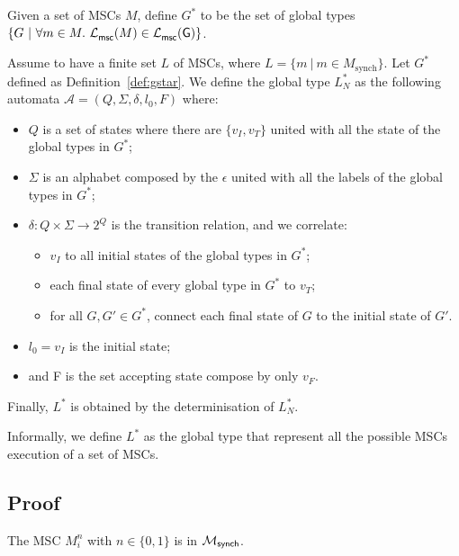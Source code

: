 \begin{definition}[$G^*$]\label{def:gstar}
Given a set of MSCs $M$, define $G^*$ to be the set of global types
$\{G\ |\ \forall m \in M.\ \mathcal{L}_{\mathsf{msc}}^{}(M)\in\mathcal{L}_{\mathsf{msc}}^{}(\mathsf{G})\}$.
\end{definition}

\begin{definition}\label{def:lstar}
Assume to have a finite set $L$ of MSCs, where  
$L = \{m\ |\ m \in M_{\text{synch}}\}$. Let $G^*$ defined as
Definition~\ref{def:gstar}.
We define the global type $L^*_{N}$ as the following automata
$\mathcal A = (Q,\Sigma, \delta, l_0, F)$ where:
\begin{itemize}
  \item $Q$ is a set of states where there are $\{v_I,v_T\}$ united with
  all the state of the global types in $G^*$;
  \item $\Sigma$ is an alphabet composed by the $\epsilon$ united with
  all the labels of the global types in $G^*$;
  \item $\delta:Q\times\Sigma\to 2^Q$ is the transition relation, and
  we correlate: 
  \begin{itemize}
    \item $v_I$ to all initial states of the global types in $G^*$;
    \item each final state of every global type in $G^*$ to $v_T$;
    \item for all $G, G' \in G^*$, connect each final state of $G$
    to the initial state of $G'$.
  \end{itemize}
  \item $l_0 = v_I$ is the initial state;
  \item and F is the set accepting state compose by only $v_F$.
\end{itemize}
Finally, $L^*$ is obtained by the determinisation of $L^*_{N}$.
\end{definition}
Informally, we define $L^*$ as the global type that represent all the
possible MSCs execution of a set of MSCs.

\subsection{Proof}

\begin{lemma}\label{lemma:minsynch}
The MSC $M_i^n$ with $n \in \{0,1\}$ is in $\mathcal{M}_{\mathsf{synch}}$.
\end{lemma}

